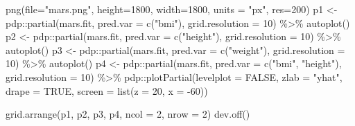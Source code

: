 \documentclass[
]{article}
\newenvironment{Shaded}{\begin{snugshade}}{\end{snugshade}}
\newcommand{\AttributeTok}[1]{\textcolor[rgb]{0.77,0.63,0.00}{#1}}
\newcommand{\ConstantTok}[1]{\textcolor[rgb]{0.00,0.00,0.00}{#1}}
\newcommand{\DecValTok}[1]{\textcolor[rgb]{0.00,0.00,0.81}{#1}}
\newcommand{\FunctionTok}[1]{\textcolor[rgb]{0.00,0.00,0.00}{#1}}
\newcommand{\NormalTok}[1]{#1}
\newcommand{\OtherTok}[1]{\textcolor[rgb]{0.56,0.35,0.01}{#1}}
\newcommand{\SpecialCharTok}[1]{\textcolor[rgb]{0.00,0.00,0.00}{#1}}
\newcommand{\StringTok}[1]{\textcolor[rgb]{0.31,0.60,0.02}{#1}}
\begin{document}
\begin{Shaded}
\begin{Highlighting}[]
\FunctionTok{png}\NormalTok{(}\AttributeTok{file=}\StringTok{"mars.png"}\NormalTok{, }\AttributeTok{height=}\DecValTok{1800}\NormalTok{, }\AttributeTok{width=}\DecValTok{1800}\NormalTok{, }\AttributeTok{units =} \StringTok{"px"}\NormalTok{, }\AttributeTok{res=}\DecValTok{200}\NormalTok{)}
\NormalTok{p1 }\OtherTok{\textless{}{-}}\NormalTok{ pdp}\SpecialCharTok{::}\FunctionTok{partial}\NormalTok{(mars.fit, }\AttributeTok{pred.var =} \FunctionTok{c}\NormalTok{(}\StringTok{"bmi"}\NormalTok{), }\AttributeTok{grid.resolution =} \DecValTok{10}\NormalTok{) }\SpecialCharTok{\%\textgreater{}\%} \FunctionTok{autoplot}\NormalTok{()}
\NormalTok{p2 }\OtherTok{\textless{}{-}}\NormalTok{ pdp}\SpecialCharTok{::}\FunctionTok{partial}\NormalTok{(mars.fit, }\AttributeTok{pred.var =} \FunctionTok{c}\NormalTok{(}\StringTok{"height"}\NormalTok{), }\AttributeTok{grid.resolution =} \DecValTok{10}\NormalTok{) }\SpecialCharTok{\%\textgreater{}\%} \FunctionTok{autoplot}\NormalTok{()}
\NormalTok{p3 }\OtherTok{\textless{}{-}}\NormalTok{ pdp}\SpecialCharTok{::}\FunctionTok{partial}\NormalTok{(mars.fit, }\AttributeTok{pred.var =} \FunctionTok{c}\NormalTok{(}\StringTok{"weight"}\NormalTok{), }\AttributeTok{grid.resolution =} \DecValTok{10}\NormalTok{) }\SpecialCharTok{\%\textgreater{}\%} \FunctionTok{autoplot}\NormalTok{()}
\NormalTok{p4 }\OtherTok{\textless{}{-}}\NormalTok{ pdp}\SpecialCharTok{::}\FunctionTok{partial}\NormalTok{(mars.fit, }\AttributeTok{pred.var =} \FunctionTok{c}\NormalTok{(}\StringTok{"bmi"}\NormalTok{, }\StringTok{"height"}\NormalTok{), }
                   \AttributeTok{grid.resolution =} \DecValTok{10}\NormalTok{) }\SpecialCharTok{\%\textgreater{}\%}
\NormalTok{      pdp}\SpecialCharTok{::}\FunctionTok{plotPartial}\NormalTok{(}\AttributeTok{levelplot =} \ConstantTok{FALSE}\NormalTok{, }\AttributeTok{zlab =} \StringTok{"yhat"}\NormalTok{, }\AttributeTok{drape =} \ConstantTok{TRUE}\NormalTok{, }
                       \AttributeTok{screen =} \FunctionTok{list}\NormalTok{(}\AttributeTok{z =} \DecValTok{20}\NormalTok{, }\AttributeTok{x =} \SpecialCharTok{{-}}\DecValTok{60}\NormalTok{))}

\FunctionTok{grid.arrange}\NormalTok{(p1, p2, p3, p4, }\AttributeTok{ncol =} \DecValTok{2}\NormalTok{, }\AttributeTok{nrow =} \DecValTok{2}\NormalTok{)}
\FunctionTok{dev.off}\NormalTok{()}
\end{Highlighting}
\end{Shaded}
\end{document}
